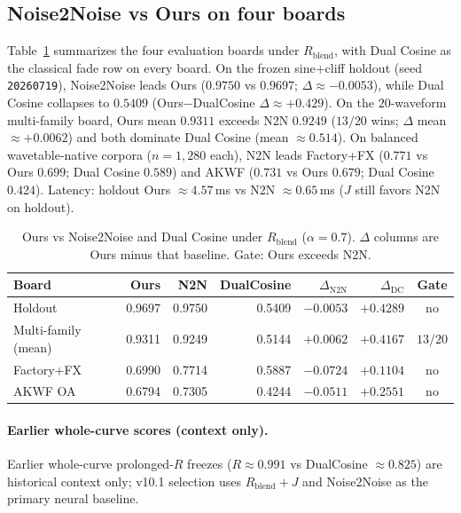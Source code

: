 \subsection{Noise2Noise vs Ours on four boards}
\label{sec:n2n-vs-ours-boards}
Table~\ref{tab:n2n-vs-ours} summarizes the four evaluation boards under $R_{\mathrm{blend}}$,
with Dual Cosine as the classical fade row on every board.
On the frozen sine{+}cliff holdout (seed \texttt{20260719}), Noise2Noise leads Ours
($0.9750$ vs $0.9697$; $\Delta{\approx}{-}0.0053$), while Dual Cosine collapses to $0.5409$
(Ours$-$DualCosine $\Delta{\approx}{+}0.429$).
On the $20$-waveform multi-family board, Ours mean $0.9311$ exceeds N2N $0.9249$
($13/20$ wins; $\Delta$ mean ${\approx}{+}0.0062$) and both dominate Dual Cosine (mean ${\approx}0.514$).
On balanced wavetable-native corpora ($n{=}1{,}280$ each), N2N leads Factory+FX
($0.771$ vs Ours $0.699$; Dual Cosine $0.589$) and AKWF
($0.731$ vs Ours $0.679$; Dual Cosine $0.424$).
Latency: holdout Ours ${\approx}4.57$\,ms vs N2N ${\approx}0.65$\,ms ($J$ still favors N2N on holdout).

\begin{table}[t]
  \centering
  \caption{Ours vs Noise2Noise and Dual Cosine under $R_{\mathrm{blend}}$ ($\alpha{=}0.7$).
    $\Delta$ columns are Ours minus that baseline. Gate: Ours exceeds N2N.}
  \label{tab:n2n-vs-ours}
  \footnotesize
  \setlength{\tabcolsep}{2pt}
  \begin{tabular}{@{}lrrrrrc@{}}
    \toprule
    Board & Ours & N2N & DualCosine & $\Delta_{\mathrm{N2N}}$ & $\Delta_{\mathrm{DC}}$ & Gate \\
    \midrule
    Holdout & 0.9697 & 0.9750 & 0.5409 & $-0.0053$ & $+0.4289$ & no \\
    Multi-family (mean) & 0.9311 & 0.9249 & 0.5144 & $+0.0062$ & $+0.4167$ & $13/20$ \\
    Factory+FX & 0.6990 & 0.7714 & 0.5887 & $-0.0724$ & $+0.1104$ & no \\
    AKWF OA & 0.6794 & 0.7305 & 0.4244 & $-0.0511$ & $+0.2551$ & no \\
    \bottomrule
  \end{tabular}
\end{table}

\paragraph{Earlier whole-curve scores (context only).}
Earlier whole-curve prolonged-$R$ freezes ($R{\approx}0.991$ vs DualCosine ${\approx}0.825$) are historical context only;
v10.1 selection uses $R_{\mathrm{blend}}{+}J$ and Noise2Noise as the primary neural baseline.

